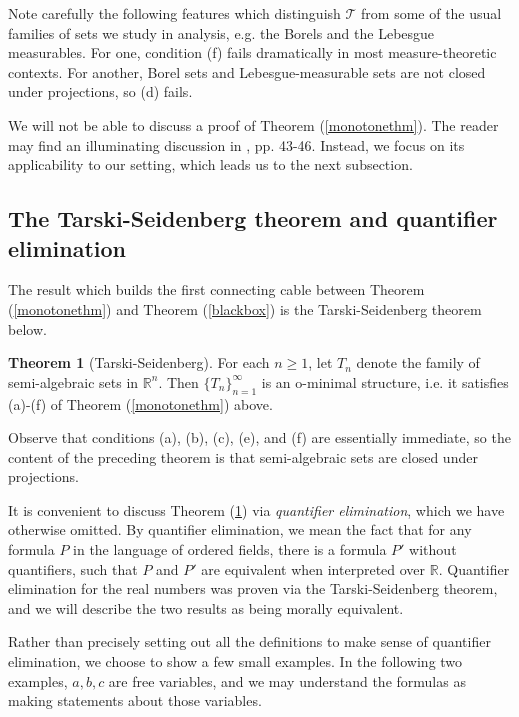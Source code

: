 \documentclass[12pt]{article}
\let\oldref\ref
\renewcommand{\ref}[1]{(\oldref{#1})}
\newcommand{\R}{\mathbb{R}}
\theoremstyle{definition}
\newtheorem{theorem}{Theorem}[section]
\theoremstyle{remark}
\numberwithin{equation}{section}
\begin{document}
Note carefully the following features which distinguish $\mathcal{T}$ from some of the usual families of sets we study in analysis, e.g. the Borels and the Lebesgue measurables. For one, condition (f) fails dramatically in most measure-theoretic contexts. For another, Borel sets and Lebesgue-measurable sets are not closed under projections, so (d) fails.

We will not be able to discuss a proof of Theorem \ref{monotonethm}. The reader may find an illuminating discussion in \cite{vdD}, pp. 43-46. Instead, we focus on its applicability to our setting, which leads us to the next subsection.

\subsection{The Tarski-Seidenberg theorem and quantifier elimination}\label{quantelimsubsection}

The result which builds the first connecting cable between Theorem \ref{monotonethm} and Theorem \ref{blackbox} is the Tarski-Seidenberg theorem below.

\begin{theorem}[Tarski-Seidenberg]\label{tarsei} For each $n\geq 1$, let $T_n$ denote the family of semi-algebraic sets in $\R^n$. Then $\{T_n\}_{n=1}^\infty$ is an o-minimal structure, i.e. it satisfies (a)-(f) of Theorem \ref{monotonethm} above.
\end{theorem}

Observe that conditions (a), (b), (c), (e), and (f) are essentially immediate, so the content of the preceding theorem is that semi-algebraic sets are closed under projections.

It is convenient to discuss Theorem \ref{tarsei} via \textit{quantifier elimination}, which we have otherwise omitted. By quantifier elimination, we mean the fact that for any formula $P$ in the language of ordered fields, there is a formula $P'$ without quantifiers, such that $P$ and $P'$ are equivalent when interpreted over $\R$. Quantifier elimination for the real numbers was proven via the Tarski-Seidenberg theorem, and we will describe the two results as being morally equivalent.

Rather than precisely setting out all the definitions to make sense of quantifier elimination, we choose to show a few small examples. In the following two examples, $a,b,c$ are free variables, and we may understand the formulas as making statements about those variables.
\end{document}
